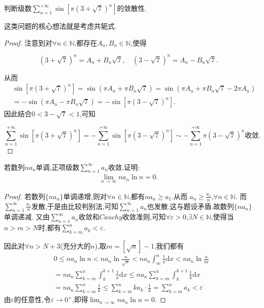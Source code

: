 \documentclass[lang=cn,newtx,10pt,scheme=chinese]{../Template/elegantbook}
\begin{document}
\begin{example}
判断级数$\sum_{n=1}^{+\infty}{\sin \left[ \pi \left( 3+\sqrt{7} \right) ^n \right]}$的敛散性.
\end{example}
\begin{note}
这类问题的核心想法就是考虑共轭式.
\end{note}
\begin{proof}
注意到对\(\forall n \in \mathbb{N}\),都存在\(A_n,B_n \in \mathbb{N}\),使得

\[
(3 + \sqrt{7})^n = A_n + B_n\sqrt{7}, \quad (3 - \sqrt{7})^n = A_n - B_n\sqrt{7}.
\]

从而
\begin{align*}
&\sin[\pi(3 + \sqrt{7})^n] = \sin(\pi A_n + \pi B_n\sqrt{7})
= \sin(\pi A_n + \pi B_n\sqrt{7} - 2\pi A_n)\\
&= -\sin(\pi A_n - \pi B_n\sqrt{7})= -\sin[\pi(3 - \sqrt{7})^n].
\end{align*}
因此结合\(0 < 3 - \sqrt{7} < 1\),可知

\[
\sum_{n = 1}^{+\infty} \sin[\pi(3 + \sqrt{7})^n] = -\sum_{n = 1}^{+\infty} \sin[\pi(3 - \sqrt{7})^n] \sim -\sum_{n = 1}^{+\infty} \pi(3 - \sqrt{7})^n \text{收敛}.
\]

\end{proof}

\begin{example}
若数列${na_n}$单调,正项级数$\sum_{n=1}^{\infty}{a_n}$收敛,证明:
\begin{align*}
\lim_{n\rightarrow \infty} na_n\ln n=0.
\end{align*}
\end{example}
\begin{proof}
若数列\(\{ na_n\}\)单调递增,则对\(\forall n \in \mathbb{N}\),都有\(na_n \geqslant a_1\).从而
\(a_n \geqslant \frac{a_1}{n}\),\(\forall n \in \mathbb{N}\).
而\(\sum_{n = 1}^{\infty}\frac{a_1}{n}\)发散,于是由比较判别法,可知\(\sum_{n = 1}^{\infty}a_n\)也发散.这与题设矛盾.故数列\(\{ na_n\}\)单调递减.
又由\(\sum_{n = 1}^{\infty}a_n\)收敛和\(Cauchy\)收敛准则,可知\(\forall \varepsilon > 0\),\(\exists N \in \mathbb{N}\),使得当\(n > m > N\)时,都有\(\sum_{k = m}^{n}a_k < \varepsilon\).

因此对\(\forall n > N + 3\)(充分大的\(n\)),取\(m = [\sqrt{n}] - 1\),我们都有
\begin{align*}
&0 \leqslant na_n\ln n < na_n\ln\frac{n}{\sqrt{n}} < na_n\int_{m}^{n}\frac{1}{x}\mathrm{d}x<na_n\ln \frac{n}{m} \\
&= na_n\sum_{k = m}^{n}\int_{k}^{k + 1}\frac{1}{x}\mathrm{d}x \leqslant na_n\sum_{k = m}^{n}\int_{k}^{k + 1}\frac{1}{k}\mathrm{d}x\\
&= na_n\sum_{k = m}^{n}\frac{1}{k} \leqslant \sum_{k = m}^{n}ka_k\cdot\frac{1}{k} = \sum_{k = m}^{n}a_k < \varepsilon
\end{align*}
由\(\varepsilon\)的任意性,令\(\varepsilon \to 0^+\),即得\(\lim_{n \to \infty}na_n\ln n = 0\). 

\end{proof}
\end{document}

